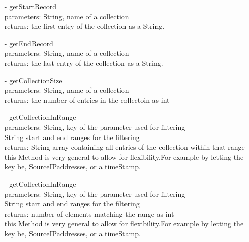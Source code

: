 \documentclass[twoside, english, draft]{design}
\begin{document}
\begin{itemize}
\begin{itemize}
			\item[-]getStartRecord
			\\parameters: String, name of a collection
			\\returns: the first entry of the collection as a String.
						
			\item[-]getEndRecord 
			\\parameters: String, name of a collection
			\\returns: the last entry of the collection as a String.
			
			\item[-]getCollectionSize
			\\parameters: String, name of a collection
			\\returns: the number of entries in the collectoin as int
			
			\item[-]getCollectionInRange
			\\parameters: String, key of the parameter used for filtering
			\\String start and end ranges for the filtering
			\\returns: String array containing all entries of the collection within that range
			\\this Method is very general to allow for flexibility.For example by letting the key be, SourceIPaddresses, or a timeStamp.
				
			\item[-]getCollectionInRange
			\\parameters: String, key of the parameter used for filtering
			\\String start and end ranges for the filtering
			\\returns: number of elements matching the range as int
			\\this Method is very general to allow for flexibility.For example by letting the key be, SourceIPaddresses, or a timeStamp.		
			
	\end{itemize}
	

\end{itemize}
\end{document}
